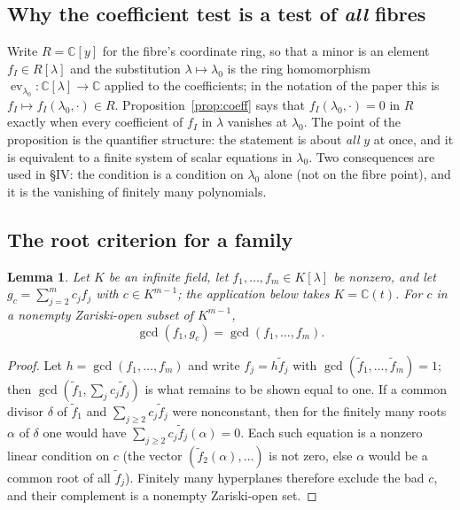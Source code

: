 \documentclass[journal]{IEEEtran}
\theoremstyle{plainn}
\newtheorem{lem}[thm]{Lemma}
\theoremstyle{remark}
\begin{document}
\subsection{Why the coefficient test is a test of \emph{all} fibres}\label{app:coeff}

Write $R=\mathbb C[y]$ for the fibre's coordinate ring, so that a minor is an element
$f_I\in R[\lambda]$ and the substitution $\lambda\mapsto\lambda_0$ is the ring homomorphism
$\operatorname{ev}_{\lambda_0}\colon \mathbb C[\lambda]\to\mathbb C$ applied to the coefficients; in
the notation of the paper this is $f_I\mapsto f_I(\lambda_0,\cdot)\in R$. Proposition~\ref{prop:coeff}
says that $f_I(\lambda_0,\cdot)=0$ in $R$ exactly when every coefficient of $f_I$ in $\lambda$ vanishes
at $\lambda_0$. The point of the proposition is the quantifier structure: the statement is about
\emph{all} $y$ at once, and it is equivalent to a finite system of scalar equations in
$\lambda_0$. Two consequences are used in \S IV: the condition is a condition on $\lambda_0$ alone
(not on the fibre point), and it is the vanishing of finitely many polynomials.

\subsection{The root criterion for a family}\label{app:root}

\begin{lem}\label{lem:generic-combo}
Let $K$ be an infinite field, let $f_1,\dots,f_m\in K[\lambda]$ be nonzero, and let
$g_c=\sum_{j=2}^{m}c_jf_j$ with $c\in K^{m-1}$; the application below takes $K=\mathbb C(t)$. For $c$ in
a nonempty Zariski-open subset of $K^{m-1}$,
$$\gcd(f_1,g_c)=\gcd(f_1,\dots,f_m).$$
\end{lem}

\begin{proof}
Let $h=\gcd(f_1,\dots,f_m)$ and write $f_j=h\tilde f_j$ with $\gcd(\tilde f_1,\dots,\tilde f_m)=1$;
then $\gcd(\tilde f_1,\sum_j c_j\tilde f_j)$ is what remains to be shown equal to one. If a common
divisor $\delta$ of $\tilde f_1$ and $\sum_{j\ge2}c_j\tilde f_j$ were nonconstant, then for the
finitely many roots $\alpha$ of $\delta$ one would have $\sum_{j\ge2}c_j\tilde f_j(\alpha)=0$. Each
such equation is a nonzero linear condition on $c$ (the vector $(\tilde f_2(\alpha),\dots)$ is not
zero, else $\alpha$ would be a common root of all $\tilde f_j$). Finitely many hyperplanes therefore
exclude the bad $c$, and their complement is a nonempty Zariski-open set.
\end{proof}
\end{document}

